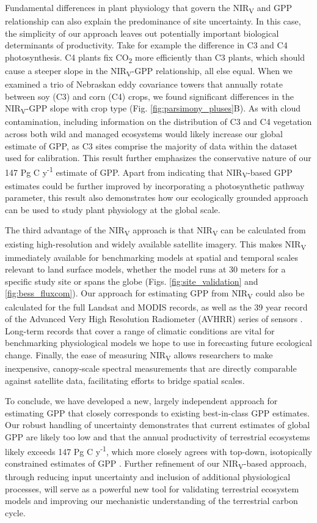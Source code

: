 \documentclass[10pt,letterpaper]{article}
\begin{document}
Fundamental differences in plant physiology that govern the NIR\textsubscript{V} and GPP relationship can also explain the predominance of site uncertainty. In this case, the simplicity of our approach leaves out potentially important biological determinants of productivity. Take for example the difference in C3 and C4 photosynthesis. C4 plants fix CO\textsubscript{2} more efficiently than C3 plants, which should cause a steeper slope in the NIR\textsubscript{V}-GPP relationship, all else equal. When we examined a trio of Nebraskan eddy covariance towers that annually rotate between soy (C3) and corn (C4) crops, we found significant differences in the NIR\textsubscript{V}-GPP slope with crop type (Fig. \ref{fig:parsimony_pluses}B). As with cloud contamination, including information on the distribution of C3 and C4 vegetation across both wild and managed ecosystems would likely increase our global estimate of GPP, as C3 sites comprise the majority of data within the dataset used for calibration. This result further emphasizes the conservative nature of our 147 Pg C y\textsuperscript{-1} estimate of GPP. Apart from indicating that NIR\textsubscript{V}-based GPP estimates could be further improved by incorporating a photosynthetic pathway parameter, this result also demonstrates how our ecologically grounded approach can be used to study plant physiology at the global scale.

The third advantage of the NIR\textsubscript{V} approach is that NIR\textsubscript{V} can be calculated from existing high-resolution and widely available satellite imagery. This makes NIR\textsubscript{V} immediately available for benchmarking models at spatial and temporal scales relevant to land surface models, whether the model runs at 30 meters for a specific study site or spans the globe (Figs. \ref{fig:site_validation} and \ref{fig:bess_fluxcom}). Our approach for estimating GPP from NIR\textsubscript{V} could also be calculated for the full Landsat and MODIS records, as well as the 39 year record of the Advanced Very High Resolution Radiometer (AVHRR) series of sensors \cite{Tucker2005}.  Long-term records that cover a range of climatic conditions are vital for benchmarking physiological models we hope to use in forecasting future ecological change. Finally, the ease of measuring NIR\textsubscript{V} allows researchers to make inexpensive, canopy-scale spectral measurements that are directly comparable against satellite data, facilitating efforts to bridge spatial scales.

To conclude, we have developed a new, largely independent approach for estimating GPP that closely corresponds to existing best-in-class GPP estimates. Our robust handling of uncertainty demonstrates that current estimates of global GPP are likely too low and that the annual productivity of terrestrial ecosystems likely exceeds 147 Pg C y\textsuperscript{-1}, which more closely agrees with top-down, isotopically constrained estimates of GPP \cite{Welp2011}.  Further refinement of our NIR\textsubscript{V}-based approach, through reducing input uncertainty and inclusion of additional physiological processes, will serve as a powerful new tool for validating terrestrial ecosystem models and improving our mechanistic understanding of the terrestrial carbon cycle.   
\end{document}
